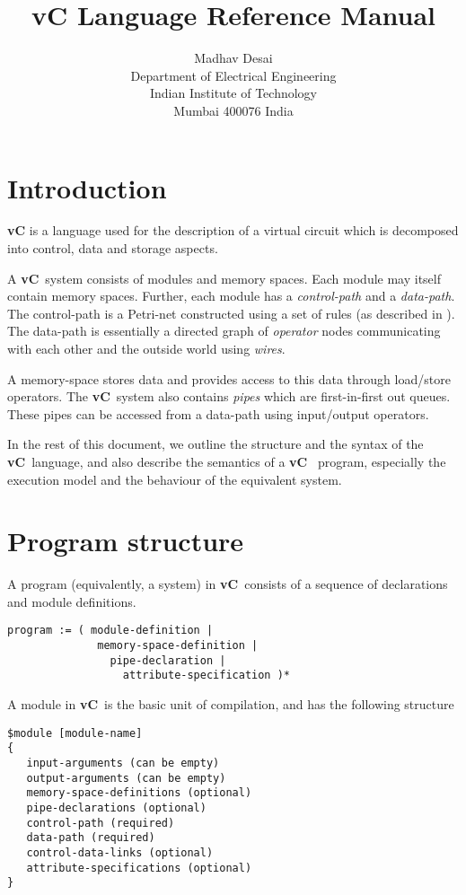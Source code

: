 \documentclass{article}
\title{vC Language Reference Manual}
\author{Madhav Desai \\ Department of Electrical Engineering \\ Indian Institute of Technology \\
	Mumbai 400076 India}
\newcommand{\vC}{{\bf vC}~}
\begin{document}
\maketitle

\section{Introduction}

{\bf vC} is a language used for the description
of a virtual circuit which is decomposed into
control, data and storage aspects.

A \vC system consists of modules and memory spaces.
Each module may itself contain memory spaces.  Further,
each module has a {\em control-path} and a {\em data-path}.
The control-path is a Petri-net constructed using
a set of rules (as described in \cite{ref:SameerPhD}).
The data-path is essentially a directed graph of {\em operator } nodes
communicating with each other and the outside world using {\em wires}.

A memory-space stores data and provides access to this
data through load/store operators.
The \vC system also  contains {\em pipes} which
are first-in-first out queues. These pipes can
be accessed from a data-path using input/output
operators.

In the rest of this document, we outline the
structure and the syntax of the \vC language,
and also describe the semantics of a \vC
program, especially the execution model and
the behaviour of the equivalent system.


\section{Program structure}


A program (equivalently, a system) in \vC consists of a sequence of
declarations and module definitions.  
\begin{verbatim}
program := ( module-definition | 
              memory-space-definition | 
                pipe-declaration | 
                  attribute-specification )*
\end{verbatim}

A module in \vC is the basic unit of compilation, and
has the following structure
\begin{verbatim}
$module [module-name] 
{
   input-arguments (can be empty)
   output-arguments (can be empty)
   memory-space-definitions (optional)
   pipe-declarations (optional)
   control-path (required)
   data-path (required)
   control-data-links (optional)
   attribute-specifications (optional)
}
\end{verbatim}
\end{document}
